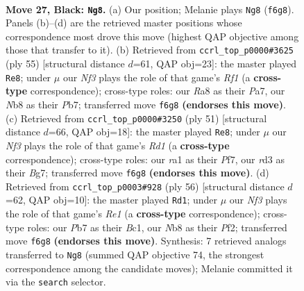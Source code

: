 \documentclass[11pt]{article}
\begin{document}
\clearpage

\begin{figure}[p]\centering
\begin{subfigure}{0.46\textwidth}\centering
\resizebox{\linewidth}{!}{%
\newchessgame
\chessboard[
  setfen={rnbNkb2/ppp1p3/5n2/P1P5/8/3R4/1P3P2/RNB1K3 b Q - 2 27},
  showmover=false,
  pgfstyle=straightmove, color=movearrow, markmove={f6-g8}
]}
\caption{}
\end{subfigure}\hfill
\begin{subfigure}{0.46\textwidth}\centering
\resizebox{\linewidth}{!}{%
\newchessgame
\chessboard[
  setfen={5rk1/pp1b1n1p/4p1p1/3pb3/3N3P/1P1R4/P2B1PP1/4R1K1 b - - 0 28},
  showmover=false,
  pgfstyle=straightmove, color=movearrow, markmove={f8-e8}
]}
\caption{}
\end{subfigure}
\\[4pt]
\begin{subfigure}{0.46\textwidth}\centering
\resizebox{\linewidth}{!}{%
\newchessgame
\chessboard[
  setfen={3r2k1/p4pb1/Bn3npp/4B3/1p1N4/6PP/PP3P2/4R1K1 b - - 2 26},
  showmover=false,
  pgfstyle=straightmove, color=movearrow, markmove={d8-e8}
]}
\caption{}
\end{subfigure}\hfill
\begin{subfigure}{0.46\textwidth}\centering
\resizebox{\linewidth}{!}{%
\newchessgame
\chessboard[
  setfen={r4k2/5pp1/2p5/p2n1b1p/P3p3/1B5P/2P2PP1/2B1R1K1 w - - 8 29},
  showmover=false,
  pgfstyle=straightmove, color=movearrow, markmove={e1-d1}
]}
\caption{}
\end{subfigure}
\caption{\textbf{Move 27, Black: \texttt{Ng8}.} (a) Our position; Melanie plays \texttt{Ng8} (\texttt{f6g8}). Panels (b)--(d) are the retrieved master positions whose correspondence most drove this move (highest QAP objective among those that transfer to it). (b) Retrieved from \texttt{ccrl\_top\_p0000\#3625} (ply 55) [structural distance $d$=61, QAP obj=23]: the master played \texttt{Re8}; under $\mu$ our \emph{Nf3} plays the role of that game's \emph{Rf1} (a \textbf{cross-type} correspondence); cross-type roles: our \emph{R}a8 as their \emph{P}a7, our \emph{N}b8 as their \emph{P}b7; transferred move \texttt{f6g8} \textbf{(endorses this move)}. (c) Retrieved from \texttt{ccrl\_top\_p0000\#3250} (ply 51) [structural distance $d$=66, QAP obj=18]: the master played \texttt{Re8}; under $\mu$ our \emph{Nf3} plays the role of that game's \emph{Rd1} (a \textbf{cross-type} correspondence); cross-type roles: our \emph{r}a1 as their \emph{P}f7, our \emph{r}d3 as their \emph{B}g7; transferred move \texttt{f6g8} \textbf{(endorses this move)}. (d) Retrieved from \texttt{ccrl\_top\_p0003\#928} (ply 56) [structural distance $d$=62, QAP obj=10]: the master played \texttt{Rd1}; under $\mu$ our \emph{Nf3} plays the role of that game's \emph{Re1} (a \textbf{cross-type} correspondence); cross-type roles: our \emph{P}b7 as their \emph{B}c1, our \emph{N}b8 as their \emph{P}f2; transferred move \texttt{f6g8} \textbf{(endorses this move)}. Synthesis: 7 retrieved analogs transferred to \texttt{Ng8} (summed QAP objective 74, the strongest correspondence among the candidate moves); Melanie committed it via the \texttt{search} selector.}
\label{fig:thought-m53}
\end{figure}
\end{document}
